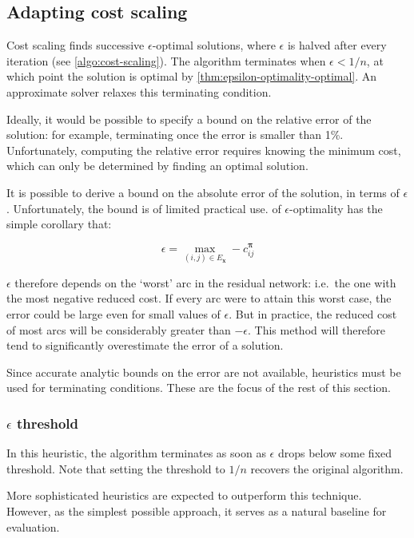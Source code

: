 \subsection{Adapting cost scaling} \label{sec:impl-approx-adaptions}

Cost scaling finds successive $\epsilon$-optimal solutions, where $\epsilon$ is halved after every iteration (see \cref{algo:cost-scaling}). The algorithm terminates when $\epsilon < 1/n$, at which point the solution is optimal by \cref{thm:epsilon-optimality-optimal}. An approximate solver relaxes this terminating condition.

Ideally, it would be possible to specify a bound on the relative error of the solution: for example, terminating once the error is smaller than 1\%. Unfortunately, computing the relative error requires knowing the minimum cost, which can only be determined by finding an optimal solution.

It is possible to derive a bound on the absolute error of the solution, in terms of $\epsilon$. Unfortunately, the bound is of limited practical use.  of $\epsilon$-optimality has the simple corollary that:

\[\epsilon = \max_{(i,j) \in E_\mathbf{x}} -c_{ij}^{\boldsymbol{\pi}}\]

$\epsilon$ therefore depends on the `worst' arc in the residual network: i.e.\ the one with the most negative reduced cost. If every arc were to attain this worst case, the error could be large even for small values of $\epsilon$. But in practice, the reduced cost of most arcs will be considerably greater than $-\epsilon$. This method will therefore tend to significantly overestimate the error of a solution.

Since accurate analytic bounds on the error are not available, heuristics must be used for terminating conditions. These are the focus of the rest of this section.

\subsubsection{$\epsilon$ threshold}

In this heuristic, the algorithm terminates as soon as $\epsilon$ drops below some fixed threshold. Note that setting the threshold to $1/n$ recovers the original algorithm.

More sophisticated heuristics are expected to outperform this technique. However, as the simplest possible approach, it serves as a natural baseline for evaluation.

